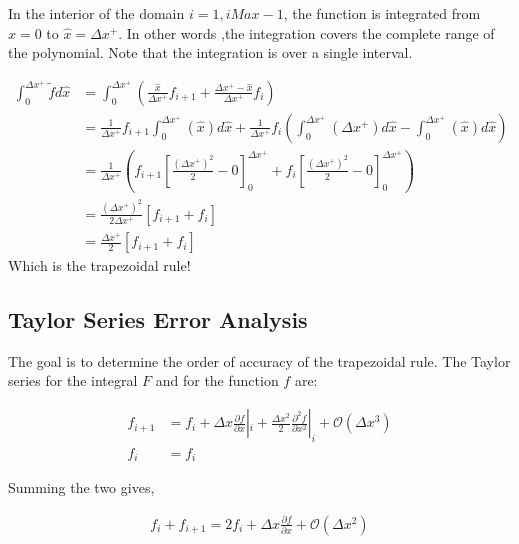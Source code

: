 \documentclass[12pt]{article}
\begin{document}
In the interior of the domain $i = 1, iMax - 1$, the function is integrated 
from $\hat{x} = 0$ to $\hat{x} = \Delta x^+$. In other words ,the integration 
covers the complete range of the polynomial. Note that the integration is over 
a single interval.

\begin{align*}
    \int_0^{\Delta x^+} \widetilde{f} d\hat{x}&=
    \int_0^{\Delta x^+}
    \left( 
        \frac{\hat{x}}{\Delta x^+}f_{i+1} +
        \frac{\Delta x^+ - \hat{x}}{\Delta x^+}f_i
\right) \\ &= 
\frac{1}{\Delta x^+}f_{i+1}
\int_{0}^{\Delta x^+} 
\left(\hat{x}  \right) d\hat{x}
+
\frac{1}{\Delta x^+}
f_{i}
\left(
    \int_{0}^{\Delta x^+} 
    \left( \Delta x^+  \right) d\hat{x}
    -
    \int_{0}^{\Delta x^+} 
    \left( 
        \hat{x}
    \right) d\hat{x}
\right)\\
           &=\frac{1}{\Delta x^+}
           \left( 
               f_{i+1}\left[ 
                   \frac{\left( \Delta x^+ \right)^2}{
                   2} - 0
               \right]_0^{\Delta x^+}
               +
               f_i
               \left[ 
\frac{\left( \Delta x^+ \right)^2}{
                   2} - 0
               \right]_0^{\Delta x^+}
           \right) \\ &=
           \frac{\left( \Delta x^+ \right)^2}{2 \Delta x^+}
           \left[ f_{i+1} +f_i\right] \\
           &= 
           \frac{\Delta x^+}{2 }
           \left[ f_{i+1} +f_i\right] 
\end{align*}
Which is the trapezoidal rule!

\subsection{Taylor Series Error Analysis}
The goal is to determine the order of accuracy of the trapezoidal rule. 
The Taylor series for the integral $F$ and for the function $f$ are:

\begin{align*}
    f_{i+1} &= f_i +
    \Delta x \frac{\partial f}{\partial x}|_i +
    \frac{\Delta x^2}{2} \frac{\partial^2 f}{\partial x^2}|_i +
    \mathcal{O}\left( \Delta x^3 \right) \\
    f_i &= f_i
\end{align*}

Summing the two gives,

\begin{align*}
f_i + f_{i+1} = 2 f_i  + \Delta x \frac{\partial f}{\partial x } +
\mathcal{O}\left( \Delta x^2 \right) 
\end{align*}
\end{document}
